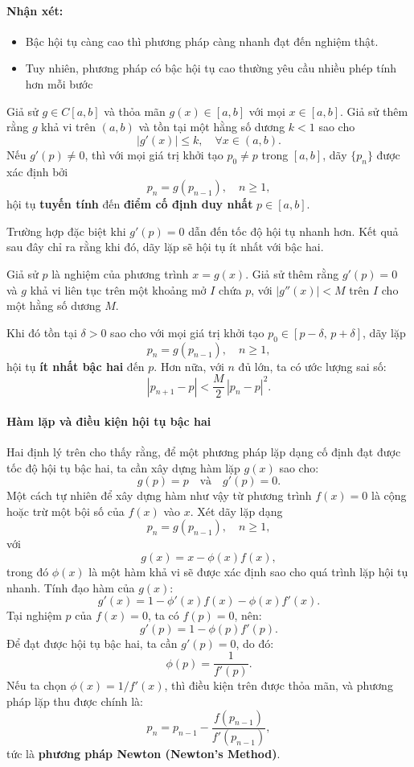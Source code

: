 \paragraph*{Nhận xét:}
\begin{itemize}
    \item Bậc hội tụ càng cao thì phương pháp càng nhanh đạt đến nghiệm thật.
    \item Tuy nhiên, phương pháp có bậc hội tụ cao thường yêu cầu nhiều phép tính hơn mỗi bước 

\end{itemize}

\begin{theorem}
Giả sử $g \in C[a, b]$ và thỏa mãn $g(x) \in [a, b]$ với mọi $x \in [a, b]$. 
Giả sử thêm rằng $g$ khả vi trên $(a, b)$ và tồn tại một hằng số dương $k < 1$ sao cho
\[
    |g'(x)| \le k, \quad \forall x \in (a, b).
\]
Nếu $g'(p) \ne 0$, thì với mọi giá trị khởi tạo $p_0 \ne p$ trong $[a, b]$, 
dãy $\{p_n\}$ được xác định bởi
\[
    p_n = g(p_{n-1}), \quad n \ge 1,
\]
hội tụ \textbf{tuyến tính} đến \textbf{điểm cố định duy nhất} $p \in [a, b]$.
\end{theorem}

Trường hợp đặc biệt khi $g'(p) = 0$ dẫn đến tốc độ hội tụ nhanh hơn. 
Kết quả sau đây chỉ ra rằng khi đó, dãy lặp sẽ hội tụ ít nhất với bậc hai.

\begin{theorem}
Giả sử $p$ là nghiệm của phương trình $x = g(x)$. 
Giả sử thêm rằng $g'(p) = 0$ và $g$ khả vi liên tục trên một khoảng mở $I$ chứa $p$, với $|g''(x)| < M$ trên $I$ cho một hằng số dương $M$.

Khi đó tồn tại $\delta > 0$ sao cho với mọi giá trị khởi tạo 
$p_0 \in [p - \delta,\, p + \delta]$, dãy lặp
\[
    p_n = g(p_{n-1}), \quad n \ge 1,
\]
hội tụ \textbf{ít nhất bậc hai} đến $p$. Hơn nữa, với $n$ đủ lớn, ta có ước lượng sai số:
\[
    |p_{n+1} - p| < \frac{M}{2}\, |p_n - p|^2.
\]
\end{theorem}

\paragraph*{Hàm lặp và điều kiện hội tụ bậc hai}
Hai định lý trên cho thấy rằng, để một phương pháp lặp dạng cố định đạt được tốc độ hội tụ bậc hai, 
ta cần xây dựng hàm lặp $g(x)$ sao cho:
\[
    g(p) = p \quad \text{và} \quad g'(p) = 0.
\]
Một cách tự nhiên để xây dựng hàm như vậy từ phương trình $f(x) = 0$
là cộng hoặc trừ một bội số của $f(x)$ vào $x$. 
Xét dãy lặp dạng
\[
    p_n = g(p_{n-1}), \quad n \ge 1,
\]
với
\[
    g(x) = x - \phi(x) f(x),
\]
trong đó $\phi(x)$ là một hàm khả vi sẽ được xác định sao cho quá trình lặp hội tụ nhanh.
Tính đạo hàm của $g(x)$:
\[
    g'(x) = 1 - \phi'(x)f(x) - \phi(x)f'(x).
\]
Tại nghiệm $p$ của $f(x) = 0$, ta có $f(p) = 0$, nên:
\[
    g'(p) = 1 - \phi(p)f'(p).
\]
Để đạt được hội tụ bậc hai, ta cần $g'(p) = 0$, do đó:
\[
    \phi(p) = \frac{1}{f'(p)}.
\]
Nếu ta chọn $\phi(x) = 1 / f'(x)$, thì điều kiện trên được thỏa mãn, và phương pháp lặp thu được chính là:
\[
    p_n = p_{n-1} - \frac{f(p_{n-1})}{f'(p_{n-1})},
\]
tức là \textbf{phương pháp Newton (Newton's Method)}.\\

